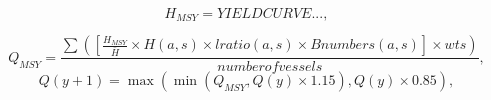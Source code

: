 \documentclass[12pt,oneline,a4paper,numbib]{ouparticle}
\numberwithin{equation}{subsection} %
\begin{document}
\begin{equation}
 H_{MSY} = YIELD CURVE..., 
\end{equation}

\begin{equation}
 Q_{MSY} = \frac
                {\sum( [\frac{H_{MSY}}{\bar{H}} \times H (a, s) \times lratio (a, s) \times B numbers(a, s)] \times wts) }
                {number of vessels}, 
\end{equation}
\begin{equation}
 Q (y+1) = \max( \min(Q_{MSY}, Q(y) \times 1.15), Q(y) \times 0.85), 
\end{equation}




        
        




\end{document}
